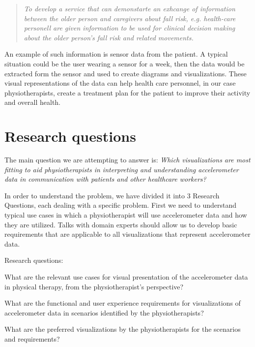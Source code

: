 \begin{quote}
\textit{To develop a service that can demonstarte an exhcange of information between the older person and caregivers about fall risk, e.g. health-care personell are given information to be used for clinical decision making about the older person's fall risk and related movements.}
\end{quote}

An example of such information is sensor data from the patient. A typical situation could be the user wearing a sensor for a week, then the data would be extracted form the sensor and used to create diagrams and visualizations. These visual representations of the data can help health care personnel, in our case physiotherapists, create a treatment plan for the patient to improve their activity and overall health. 

\section{Research questions}
\label{sec:researchQuestions}
The main question we are attempting to answer is: \textit{Which visualizations are most fitting to aid physiotherapists in interpreting and understanding accelerometer data in communication with patients and other healthcare workers?}

In order to understand the problem, we have divided it into 3 Research Questions, each dealing with a specific problem. First we need to understand typical use cases in which a physiotherapist will use accelerometer data and how they are utilized. Talks with domain experts should allow us to develop basic requirements that are applicable to all visualizations that represent accelerometer data.

Research questions:
\vspace{-15pt}
\begin{description}[parsep=0pt, itemsep=0pt]
\item[Research Question 1:] What are the relevant use cases for visual presentation of the accelerometer data in physical therapy, from the physiotherapist's perspective?

\item[Research Question 2:] What are the functional and user experience requirements for visualizations of accelerometer data in scenarios identified by the physiotherapists?

\item[Research Question 3:] What are the preferred visualizations by the physiotherapists for the scenarios and requirements?
\end{description}

